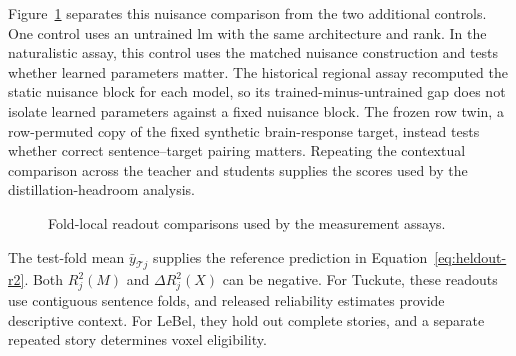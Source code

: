 Figure~\ref{fig:measurement-readouts} separates this nuisance comparison from the two additional controls.
One control uses an untrained \ac{lm} with the same architecture and rank.
In the naturalistic assay, this control uses the matched nuisance construction and tests whether learned parameters matter.
The historical regional assay recomputed the static nuisance block for each model, so its trained-minus-untrained gap does not isolate learned parameters against a fixed nuisance block.
The frozen row twin, a row-permuted copy of the fixed synthetic brain-response target, instead tests whether correct sentence--target pairing matters.
Repeating the contextual comparison across the teacher and students supplies the scores used by the distillation-headroom analysis.

\begin{figure}[H]
  \centering
  \resizebox{\textwidth}{!}{}
  \caption{Fold-local readout comparisons used by the measurement assays.}
  \label{fig:measurement-readouts}
\end{figure}
\FloatBarrier

The test-fold mean \(\bar y_{\mathcal Tj}\) supplies the reference prediction in Equation~\ref{eq:heldout-r2}.
Both \(R_j^2(M)\) and \(\Delta R_j^2(X)\) can be negative.
For Tuckute, these readouts use contiguous sentence folds, and released reliability estimates provide descriptive context.
For LeBel, they hold out complete stories, and a separate repeated story determines voxel eligibility.

